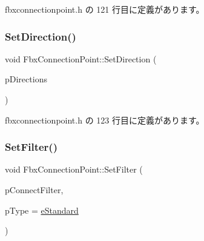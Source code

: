 fbxconnectionpoint.\+h の 121 行目に定義があります。

\mbox{\label{class_fbx_connection_point_a9cf7e52c6dfab9bb7a3d9242635a42c9}} 
\subsubsection{\texorpdfstring{Set\+Direction()}{SetDirection()}}
{\footnotesize\ttfamily void Fbx\+Connection\+Point\+::\+Set\+Direction (\begin{DoxyParamCaption}\item[{int}]{p\+Directions }\end{DoxyParamCaption})\hspace{0.3cm}{\ttfamily [inline]}}



 fbxconnectionpoint.\+h の 123 行目に定義があります。

\mbox{\label{class_fbx_connection_point_a06c3718eb58d2fb0c027bebc85a78753}} 
\subsubsection{\texorpdfstring{Set\+Filter()}{SetFilter()}}
{\footnotesize\ttfamily void Fbx\+Connection\+Point\+::\+Set\+Filter (\begin{DoxyParamCaption}\item[{\hyperlink{class_fbx_connection_point_filter}{Fbx\+Connection\+Point\+Filter} $\ast$}]{p\+Connect\+Filter,  }\item[{\hyperlink{class_fbx_connection_point_a152767d2d289717698ab68d808f979b5}{E\+Type}}]{p\+Type = {\ttfamily \hyperlink{class_fbx_connection_point_a152767d2d289717698ab68d808f979b5af32832e57001937110a6f8b1c4ce1160}{e\+Standard}} }\end{DoxyParamCaption})}

\mbox{\label{class_fbx_connection_point_a00b7c81a489585571eceabf08890fa86}} 
